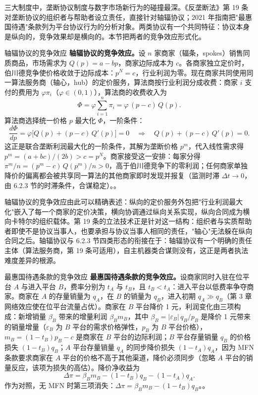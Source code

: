 三大制度中，垄断协议制度与数字市场新行为的碰撞最深。《反垄断法》第 19 条对垄断协议的组织者与帮助者设立责任，直接针对轴辐协议；2021 年指南把"最惠国待遇"条款列为平台协议行为的分析对象。两类协议有一个共同特征：协议本身是纵向的，竞争效果却是横向的。本节把两者的竞争效应形式化。

\begin{derivation}{轴辐协议的竞争效应}{}
\textbf{轴辐协议的竞争效应。}设 $n$ 家商家（辐条，spokes）销售同质商品，市场需求为 $Q(p) = a - bp$，商家边际成本为 $c$。各商家独立定价时，伯川德竞争使价格收敛于边际成本：$p^N = c$，行业利润为零。现在商家共同使用同一算法服务商（轴心，hub）的定价服务，算法商按行业利润分成收费：商家 $i$ 支付的费用为 $\varphi \pi_i$（$\varphi \in (0,1)$），算法商的收费收入为
\[
\Phi = \varphi \sum_{i=1}^{n} \pi_i = \varphi\, (p - c)\, Q(p).
\]
算法商选择统一价格 $p$ 最大化 $\Phi$，一阶条件：
\[
\frac{d\Phi}{dp} = \varphi \bigl[ Q(p) + (p - c)\, Q'(p) \bigr] = 0
\quad\Longrightarrow\quad
Q(p) + (p - c)\, Q'(p) = 0.
\]
这正是联合垄断利润最大化的一阶条件，其解为垄断价格 $p^m$，代入线性需求得 $p^m = (a + bc)/(2b) > c = p^N$。商家接受这一安排：每家分得 $\pi^m/n = (p^m - c)\, Q(p^m)/n > 0$，高于伯川德竞争下的零利润；任何商家单独降价的偏离都会被共享同一算法的其他商家即时发现并报复（监测时滞 $\Delta t \to 0$，由 6.2.3 节的时滞条件，合谋稳定）。。
\end{derivation}

轴辐协议的竞争效应由此可以精确表述：纵向的定价服务外包把"行业利润最大化"嵌入了每一个商家的定价决策，横向协调通过纵向关系实现，纵向合同成为横向卡特尔的组织载体。第 19 条的立法技术正是针对这一结构：组织者与实质帮助者即使不是协议当事人，也要承担与协议当事人相同的责任，"轴心"无法躲在纵向合同之后。轴辐协议与 6.2.3 节四类形态的衔接在于：轴辐协议有一个明确的责任主体（算法服务商，第 19 条可适用），自主机器类合谋则没有，这正是两者执法难度差异的根源。

\begin{derivation}{最惠国待遇条款的竞争效应}{}
\textbf{最惠国待遇条款的竞争效应。}设商家同时入驻在位平台 $A$ 与进入平台 $B$，费率分别为 $t_A$ 与 $t_B$，且 $t_B < t_A$：进入平台以低费率争夺商家。商家在 $A$ 的存量销量为 $q_A$，在 $B$ 的销量为 $q_B$，进入初期 $q_A \gg q_B$（第 3 章网络效应使在位平台流量占优）。商家在 $B$ 平台降价 1 元，利润变化由三项构成：新增销量 $\beta_B$ 带来的增量利润 $\beta_B m_B$，其中 $\beta_B = |\varepsilon_B|\, q_B / p_B$ 是降价 1 元带来的销量增量（$\varepsilon_B$ 为 $B$ 平台的需求价格弹性，$p_B$ 为 $B$ 平台价格），$m_B = (1 - t_B) p_B - c$ 是商家在 $B$ 平台的边际利润；$B$ 平台存量销量 $q_B$ 的价格损失 $(1 - t_B) q_B$；$A$ 平台存量销量 $q_A$ 的同步降价损失 $(1 - t_A) q_A$，因为 MFN 条款要求商家在 $A$ 平台的价格不高于其他渠道，降价必须同步（忽略 $A$ 平台的销量反应，该项为损失的高估）。降价净收益为
\[
\Delta\pi = \beta_B m_B - (1 - t_B) q_B - (1 - t_A) q_A.
\]
作为对照，无 MFN 时第三项消失：$\Delta\pi = \beta_B m_B - (1 - t_B) q_B$。。
\end{derivation}

